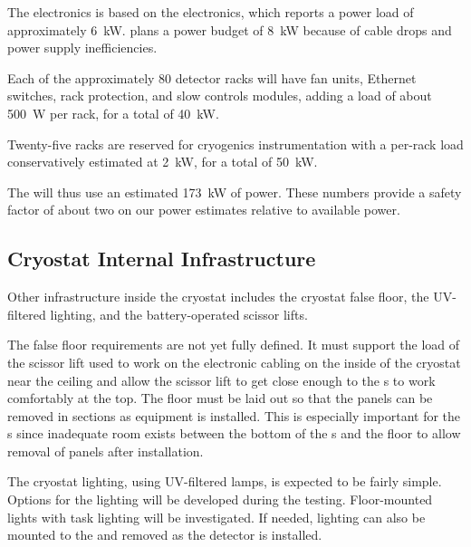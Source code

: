 
The  electronics is based on the  electronics, which reports a power load of approximately  \SI{6}{kW}.   plans a power budget of  \SI{8}{kW} because of cable drops and  power supply inefficiencies.  

Each of the approximately 80 detector racks will have fan units, Ethernet switches, rack protection, and slow controls modules, adding a load of about \SI{500}{W} per rack, for a total of \SI{40}{kW}.

Twenty-five racks are reserved for cryogenics instrumentation with a per-rack load conservatively estimated at \SI{2}{kW}, for a total of \SI{50}{kW}. 

The  will thus use  an estimated \SI{173}{kW} of power.   These numbers provide a safety factor of about two on our power estimates relative to available power.


\subsection{Cryostat Internal Infrastructure}
\label{sec:fdsp-tc-infr-cryo-int}



Other infrastructure inside the cryostat includes the cryostat false floor, the UV-filtered lighting, and the battery-operated scissor lifts. 

The false floor requirements are not yet fully defined.  
It must support the load of the scissor lift used to work on the electronic cabling on the inside of the cryostat near the ceiling and allow the scissor lift to get close enough to the s to work comfortably at the top. 
The floor  must be laid out so that the panels can be removed in sections %
as equipment is installed. 
This is especially important for the s %
since inadequate room exists between the bottom of the s and the floor to allow removal of panels after installation. 

The cryostat lighting, using UV-filtered  lamps, is expected to be fairly simple. Options for the lighting will be developed during the  testing.
Floor-mounted lights with task lighting will be investigated. If needed, lighting can also be mounted to the  and removed as the detector is installed.

